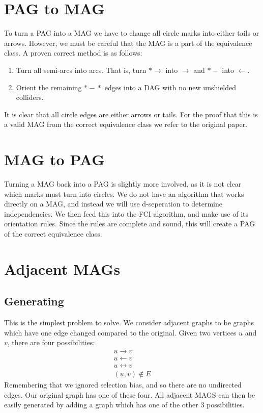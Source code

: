 \documentclass[11pt,a4paper]{report}
\theoremstyle{definition}
\begin{document}
\section{PAG to MAG}
To turn a PAG into a MAG we have to change all circle marks into either
tails or arrows. However, we must be careful that the MAG is a part of the
equivalence class. A proven correct method is as follows:

\begin{enumerate}
  \item Turn all semi-arcs into arcs. That is, turn
    $*\!\!\!\rightarrow$ into $\rightarrow$ and
    $*\!-$ into $\leftarrow$.

  \item Orient the remaining $*\!\!\!-\!\!\!*$ edges into a DAG with no new unshielded
    colliders.
\end{enumerate}
It is clear that all circle edges are either arrows or tails. For the
proof that this is a valid MAG from the correct equivalence class we refer
to the original paper\cite{zhangCompletenessOrientationRules2008}.

\section{MAG to PAG}
Turning a MAG back into a PAG is slightly more involved, as it is not
clear which marks must turn into circles. We do not have an algorithm that
works directly on a MAG, and instead we will use d-seperation to determine
independencies. We then feed this into the FCI algorithm, and make use of
its orientation rules. Since the rules are complete and sound, this will
create a PAG of the correct equivalence class.

\section{Adjacent MAGs}
\subsection{Generating}
This is the simplest problem to solve. We consider adjacent graphs to be
graphs which have one edge changed compared to the original. Given two
vertices $u$ and $v$, there are four possibilities:
\begin{align}
  u \rightarrow v \\
  u \leftarrow v \\
  u \leftrightarrow v\\
  (u, v) \notin E
\end{align}
Remembering that we ignored selection bias, and so there are no undirected
edges. Our original graph has one of these four. All adjacent MAGS can
then be easily generated by adding a graph which has one of the other 3
possibilities.
\end{document}
